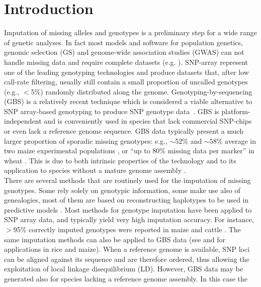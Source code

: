 \section{Introduction}
\label{intro}

Imputation of missing alleles and genotypes is a preliminary step for
a wide range of genetic analyses. In fact most models and software for 
population genetics, genomic selection (GS) and genome-wide association 
studies (GWAS) can not handle missing data and require complete datasets (e.g. \cite{hayes2009invited,aulchenko2007genabel,endelman2011rrblup,perez2014genome}). 
SNP-array represent one of the leading genotyping technologies and produce 
datasets that, after low call-rate filtering, 
usually still contain a small proportion of uncalled genotypes (e.g., $<$5\%) 
randomly distributed along the genome. Genotyping-by-sequencing (GBS) is a 
relatively recent technique which is considered a viable alternative to SNP array-based genotyping to produce SNP genotype data~\cite{elshire_robust_2011}.
GBS is platform-independent and is conveniently 
used in species that lack commercial SNP-chips or even lack a reference 
genome sequence. GBS data typically present a much larger proportion of 
sporadic missing genotypes: e.g., $\sim$52\% and $\sim 58\%$ average in two maize experimental populations \cite{crossa_genomic_2013},
or ``up to 80\% missing data per marker'' in wheat \cite{poland_genomic_2012}. This 
is due to both intrinsic properties of the technology
and to its application to species without a mature genome assembly \cite{glaubitz_tassel-gbs:_2014}.\\
There are several methods that are routinely used for the imputation of 
missing genotypes. Some rely solely on genotypic information, some make 
use also of genealogies, most of them are based on reconstructing haplotypes 
to be used in predictive models \cite{nicolazzi_software_2015}. Most methods for 
genotype imputation have been applied to SNP array data, and typically 
yield very high imputation accuracy. For instance, $>$95\% correctly imputed 
genotypes were reported in maize \cite{hickey_factors_2012} and cattle \cite{vanraden_genomic_2011}. 
The same imputation methods can also be applied to GBS data (see \cite{huang_efficient_2014} and \cite{swarts_novel_2014} for applications in rice and maize). When a reference 
genome is available, SNP loci can be aligned against its sequence and 
are therefore ordered, thus allowing the exploitation of local linkage disequilibrium (LD).
However, GBS data may be generated 
also for species lacking a reference genome assembly. In this case the 
